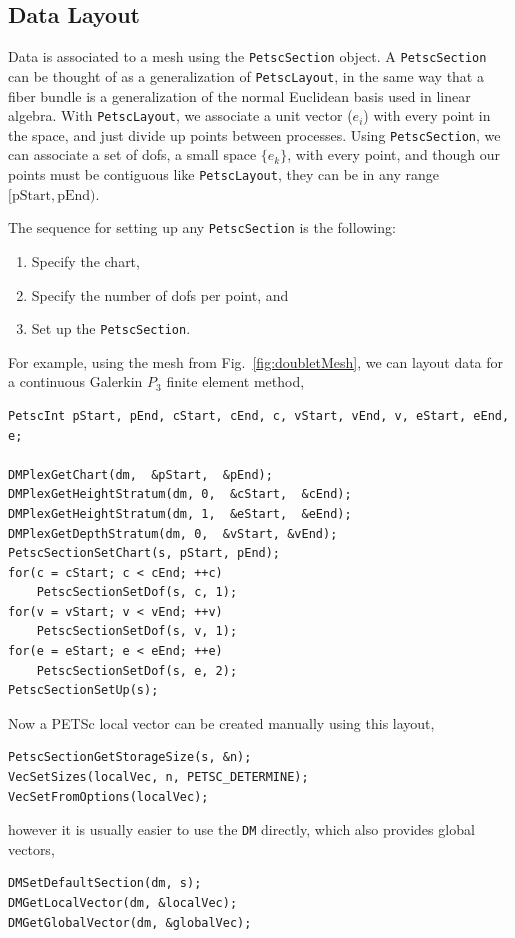 \subsection{Data Layout}

Data is associated to a mesh using the \lstinline{PetscSection} object. A \lstinline{PetscSection} can be thought of as a generalization of
\lstinline{PetscLayout}, in the same way that a fiber bundle is a generalization of the normal Euclidean basis used in linear
algebra. With \lstinline{PetscLayout}, we associate a unit vector ($e_i$) with every point in the space, and just divide up points
between processes. Using \lstinline{PetscSection}, we can associate a set of dofs, a small space $\{e_k\}$, with every point, and
though our points must be contiguous like \lstinline{PetscLayout}, they can be in any range $[\mathrm{pStart}, \mathrm{pEnd})$.

The sequence for setting up any \lstinline{PetscSection} is the following:
\begin{enumerate}
  \item Specify the chart,
  \item Specify the number of dofs per point, and
  \item Set up the \lstinline{PetscSection}.
\end{enumerate}
For example, using the mesh from Fig.~\ref{fig:doubletMesh}, we can layout data for a continuous Galerkin $P_3$ finite
element method,
\begin{lstlisting}
PetscInt pStart, pEnd, cStart, cEnd, c, vStart, vEnd, v, eStart, eEnd, e;

DMPlexGetChart(dm,  &pStart,  &pEnd);
DMPlexGetHeightStratum(dm, 0,  &cStart,  &cEnd);
DMPlexGetHeightStratum(dm, 1,  &eStart,  &eEnd);
DMPlexGetDepthStratum(dm, 0,  &vStart, &vEnd);
PetscSectionSetChart(s, pStart, pEnd);
for(c = cStart; c < cEnd; ++c)
    PetscSectionSetDof(s, c, 1);
for(v = vStart; v < vEnd; ++v)
    PetscSectionSetDof(s, v, 1);
for(e = eStart; e < eEnd; ++e)
    PetscSectionSetDof(s, e, 2);
PetscSectionSetUp(s);
\end{lstlisting}
Now a PETSc local vector can be created manually using this layout,
\begin{lstlisting}
PetscSectionGetStorageSize(s, &n);
VecSetSizes(localVec, n, PETSC_DETERMINE);
VecSetFromOptions(localVec);
\end{lstlisting}
however it is usually easier to use the \lstinline{DM} directly, which also provides global vectors,
\begin{lstlisting}
DMSetDefaultSection(dm, s);
DMGetLocalVector(dm, &localVec);
DMGetGlobalVector(dm, &globalVec);
\end{lstlisting}

